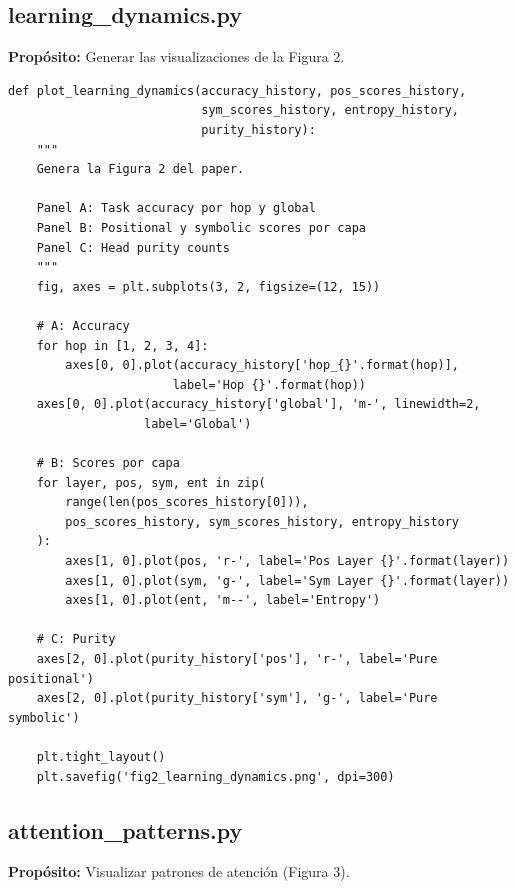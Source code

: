\documentclass[12pt,a4paper]{report}
\begin{document}
\subsection{learning\_dynamics.py}
\label{subsec:learning_dynamics}

\textbf{Propósito:} Generar las visualizaciones de la Figura 2.

\begin{lstlisting}
def plot_learning_dynamics(accuracy_history, pos_scores_history, 
                           sym_scores_history, entropy_history, 
                           purity_history):
    """
    Genera la Figura 2 del paper.
    
    Panel A: Task accuracy por hop y global
    Panel B: Positional y symbolic scores por capa
    Panel C: Head purity counts
    """
    fig, axes = plt.subplots(3, 2, figsize=(12, 15))
    
    # A: Accuracy
    for hop in [1, 2, 3, 4]:
        axes[0, 0].plot(accuracy_history['hop_{}'.format(hop)], 
                       label='Hop {}'.format(hop))
    axes[0, 0].plot(accuracy_history['global'], 'm-', linewidth=2, 
                   label='Global')
    
    # B: Scores por capa
    for layer, pos, sym, ent in zip(
        range(len(pos_scores_history[0])),
        pos_scores_history, sym_scores_history, entropy_history
    ):
        axes[1, 0].plot(pos, 'r-', label='Pos Layer {}'.format(layer))
        axes[1, 0].plot(sym, 'g-', label='Sym Layer {}'.format(layer))
        axes[1, 0].plot(ent, 'm--', label='Entropy')
    
    # C: Purity
    axes[2, 0].plot(purity_history['pos'], 'r-', label='Pure positional')
    axes[2, 0].plot(purity_history['sym'], 'g-', label='Pure symbolic')
    
    plt.tight_layout()
    plt.savefig('fig2_learning_dynamics.png', dpi=300)
\end{lstlisting}

\subsection{attention\_patterns.py}
\label{subsec:attention_patterns}

\textbf{Propósito:} Visualizar patrones de atención (Figura 3).
\end{document}
